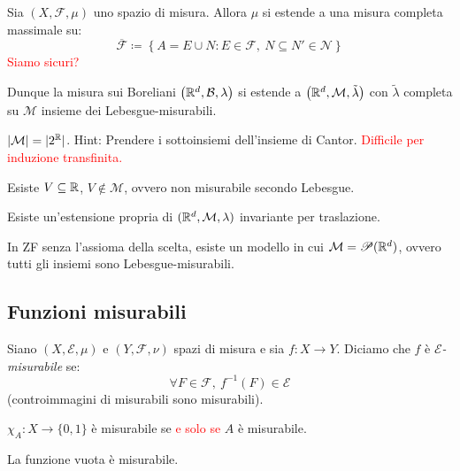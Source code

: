 \begin{thm}
	Sia $ (X,\mathcal{F},\mu) $ uno spazio di misura. Allora $ \mu $ si estende a una misura completa massimale su:
	\[ \overline{\mathcal{F}} \coloneqq \left\{ A = E \cup N : E\in \mathcal{F},\ N\subseteq N' \in \mathscr{N} \right\} \]
	\textcolor{red}{Siamo sicuri?}
\end{thm}
Dunque la misura sui Boreliani $\big(\mathbb{R}^d, \mathcal{B}, \lambda\big)$ si estende a $\big(\mathbb{R}^d, \mathcal{M}, \tilde\lambda \big)$ con $\tilde\lambda$ completa su \(\mathcal{M}\) insieme dei Lebesgue-misurabili.

\begin{exercise}
	$\left|\mathcal{M}\right|=|2^{\mathbb{R}}|$.
	Hint: Prendere i sottoinsiemi dell'insieme di Cantor. \textcolor{red}{Difficile per induzione transfinita.}
\end{exercise}
\begin{exercise}
	Esiste $V\subseteq \mathbb{R}$, $V\not\in \mathcal{M}$, ovvero non misurabile secondo Lebesgue.
\end{exercise}
\begin{exercise}
	Esiste un'estensione propria di $(\mathbb{R}^d, \mathcal{M}, \lambda)$ invariante per traslazione.
\end{exercise}
\begin{exercise}
	In ZF senza l'assioma della scelta, esiste un modello in cui $\mathcal{M}=\mathscr{P}(\mathbb{R}^d)$, ovvero tutti gli insiemi sono Lebesgue-misurabili.
\end{exercise}

\subsection{Funzioni misurabili}
\begin{definition}
	Siano $ (X,\mathcal{E},\mu) $ e $ (Y,\mathcal{F},\nu) $ spazi di misura e sia $ f\colon X\to Y $.
	Diciamo che $ f $ è \emph{$ \mathcal{E} $-misurabile} se:
	\[ \forall F \in \mathcal{F}, \ f^{-1}(F) \in \mathcal{E} \]
	(controimmagini di misurabili sono misurabili).
\end{definition}
\begin{exercise}
	$ \chi_A \colon X \to \{0,1\} $ è misurabile se \textcolor{red}{e solo se} $ A $ è misurabile.
\end{exercise}
\begin{oss}
	La funzione vuota è misurabile.
\end{oss}

